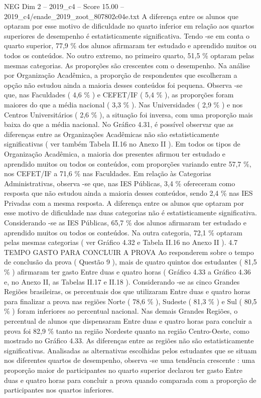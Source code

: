 \begin{textsample}{NEG Dim 2 – 2019\_c4 – Score 15.00 – 2019\_c4/enade\_2019\_zoot\_807802c04e.txt}
A diferença entre os alunos que optaram por esse motivo de dificuldade no quarto inferior em relação aos quartos superiores de desempenho é estatisticamente significativa.
Tendo -se em conta o quarto superior, 77,9 \% dos alunos afirmaram ter estudado e aprendido muitos ou todos os conteúdos.
No outro extremo, no primeiro quarto, 51,5 \% optaram pelas mesmas categorias.
As proporções são crescentes com o desempenho.
Na análise por Organização Acadêmica, a proporção de respondentes que escolheram a opção não estudou ainda a maioria desses conteúdos foi pequena.
Observa -se que, nas Faculdades ( 4,6 \% ) e CEFET/IF ( 5,4 \% ), as proporções foram maiores do que a média nacional ( 3,3 \% ).
Nas Universidades ( 2,9 \% ) e nos Centros Universitários ( 2,6 \% ), a situação foi inversa, com uma proporção mais baixa do que a média nacional.
No Gráfico 4.31, é possível observar que as diferenças entre as Organizações Acadêmicas não são estatisticamente significativas ( ver também Tabela II.16 no Anexo II ).
Em todos os tipos de Organização Acadêmica, a maioria dos presentes afirmou ter estudado e aprendido muitos ou todos os conteúdos, com proporções variando entre 57,7 \%, nos CEFET/IF a 71,6 \% nas Faculdades.
Em relação às Categorias Administrativas, observa -se que, nas IES Públicas, 3,4 \% ofereceram como resposta que não estudou ainda a maioria desses conteúdos, sendo 2,4 \% nas IES Privadas com a mesma resposta.
A diferença entre os alunos que optaram por esse motivo de dificuldade nas duas categorias não é estatisticamente significativa.
Considerando -se as IES Públicas, 65,7 \% dos alunos afirmaram ter estudado e aprendido muitos ou todos os conteúdos.
Na outra categoria, 72,1 \% optaram pelas mesmas categorias ( ver Gráfico 4.32 e Tabela II.16 no Anexo II ). 4.7 TEMPO GASTO PARA CONCLUIR A PROVA Ao responderem sobre o tempo de conclusão da prova ( Questão 9 ), mais de quatro quintos dos estudantes ( 81,5 \% ) afirmaram ter gasto Entre duas e quatro horas ( Gráfico 4.33 a Gráfico 4.36 e, no Anexo II, as Tabelas II.17 e II.18 ).
Considerando -se as cinco Grandes Regiões brasileiras, os percentuais dos que utilizaram Entre duas e quatro horas para finalizar a prova nas regiões Norte ( 78,6 \% ), Sudeste ( 81,3 \% ) e Sul ( 80,5 \% ) foram inferiores ao percentual nacional.
Nas demais Grandes Regiões, o percentual de alunos que dispensaram Entre duas e quatro horas para concluir a prova foi 82,9 \% tanto na região Nordeste quanto na região Centro-Oeste, como mostrado no Gráfico 4.33.
As diferenças entre as regiões não são estatisticamente significativas.
Analisadas as alternativas escolhidas pelos estudantes que se situam nos diferentes quartos de desempenho, observa -se uma tendência crescente : uma proporção maior de participantes no quarto superior declarou ter gasto Entre duas e quatro horas para concluir a prova quando comparada com a proporção de participantes nos quartos inferiores.

\end{textsample}
